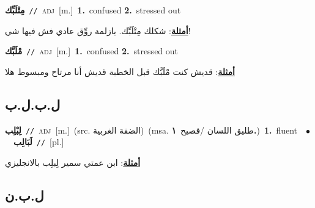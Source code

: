 \documentclass[10pt,a4paper,twoside]{article} %
\begin{document}
\begin{multicols}{2}
{{{{{{{{{{{{\setlength\topsep{0pt}\textbf{\foreignlanguage{arabic}{مِتْلَبِّك}}\ {\color{gray}\texttt{//}\color{black}}\ \textsc{adj}\ [m.]\ \textbf{1.}~confused  \textbf{2.}~stressed out\  \begin{flushright}\color{gray}\foreignlanguage{arabic}{\textbf{\underline{\foreignlanguage{arabic}{أمثلة}}}: شكلك مِتْلَبِّك. يازلمة روِّق عادي فش فيها شي!}\end{flushright}\color{black}} \vspace{2mm}

{\setlength\topsep{0pt}\textbf{\foreignlanguage{arabic}{مْلَبَّك}}\ {\color{gray}\texttt{//}\color{black}}\ \textsc{adj}\ [m.]\ \textbf{1.}~confused  \textbf{2.}~stressed out\  \begin{flushright}\color{gray}\foreignlanguage{arabic}{\textbf{\underline{\foreignlanguage{arabic}{أمثلة}}}: قديش كنت مْلَبَّك قبل الخطبة قديش أنا مرتاح ومبسوط هلا}\end{flushright}\color{black}} \vspace{2mm}

\vspace{-3mm}
\subsection*{\color{blue}\foreignlanguage{arabic}{ل.ب.ل.ب}\color{blue}{}} 

{\setlength\topsep{0pt}\textbf{\foreignlanguage{arabic}{لِبْلِب}}\ {\color{gray}\texttt{//}\color{black}}\ \textsc{adj}\ [m.]\ (src. \color{gray}\foreignlanguage{arabic}{الضفة الغربية}\color{black})\ \color{gray}(msa. \foreignlanguage{arabic}{طليق اللسان /فصيح}~\foreignlanguage{arabic}{\textbf{١.}})\color{black}\ \textbf{1.}~fluent\ \ $\bullet$\ \ \setlength\topsep{0pt}\textbf{\foreignlanguage{arabic}{لَبَالِب}}\ {\color{gray}\texttt{//}\color{black}}\ [pl.]\  \begin{flushright}\color{gray}\foreignlanguage{arabic}{\textbf{\underline{\foreignlanguage{arabic}{أمثلة}}}: ابن عمتي سمير لِبلِب بالانجليزي}\end{flushright}\color{black}} \vspace{2mm}

\vspace{-3mm}
\subsection*{\color{blue}\foreignlanguage{arabic}{ل.ب.ن}\color{blue}{}} 

}}}}}}}}}}}
\end{multicols}
\end{document}
